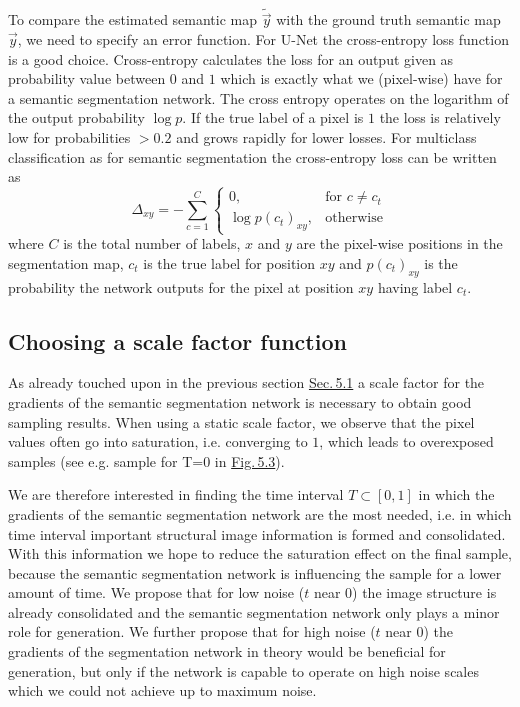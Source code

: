 To compare the estimated semantic map $\tilde{\vec{y}}$ with the ground truth semantic map $\vec{y}$, we need to specify an error function. For U-Net the cross-entropy loss function is a good choice. Cross-entropy calculates the loss for an output given as probability value between $0$ and $1$ which is exactly what we (pixel-wise) have for a semantic segmentation network. The cross entropy operates on the logarithm of the output probability $\log p$. If the true label of a pixel is $1$ the loss is relatively low for probabilities $>0.2$ and grows rapidly for lower losses. For multiclass classification as for semantic segmentation the cross-entropy loss can be written as
%
\begin{equation}
    \Delta_{xy}=-\sum_{c=1}^C 
    \begin{cases}
        0, &\text{for } c\neq c_t\\
        \log p(c_t)_{xy}, &\text{otherwise}
    \end{cases}
\end{equation}
%
where $C$ is the total number of labels, $x$ and $y$ are the pixel-wise positions in the segmentation map, $c_t$ is the true label for position $xy$ and $p(c_t)_{xy}$ is the probability the network outputs for the pixel at position $xy$ having label $c_t$.
%
\subsection{Choosing a scale factor function} \label{sec:5.2.5}
As already touched upon in the previous section \hyperref[sec:5.1]{Sec.\,5.1} a scale factor for the gradients of the semantic segmentation network is necessary to obtain good sampling results. When using a static scale factor, we observe that the pixel values often go into saturation, i.e. converging to $1$, which leads to overexposed samples (see e.g. sample for T=0 in \hyperref[fig:5.3]{Fig.\,5.3}). 

We are therefore interested in finding the time interval $T\subset[0,1]$ in which the gradients of the semantic segmentation network are the most needed, i.e. in which time interval important structural image information is formed and consolidated. With this information we hope to reduce the saturation effect on the final sample, because the semantic segmentation network is influencing the sample for a lower amount of time. We propose that for low noise ($t$ near $0$) the image structure is already consolidated and the semantic segmentation network only plays a minor role for generation. We further propose that for high noise ($t$ near $0$) the gradients of the segmentation network in theory would be beneficial for generation, but only if the network is capable to operate on high noise scales which we could not achieve up to maximum noise.

